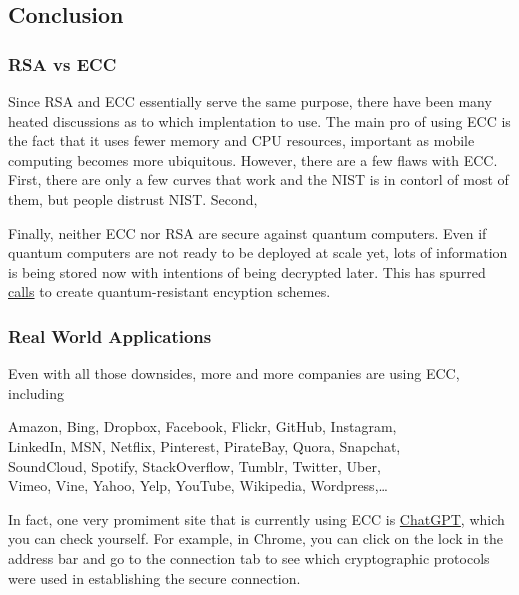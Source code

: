 \documentclass{article}
\begin{document}

\subsection*{Conclusion}

    \subsubsection*{RSA vs ECC}

    Since RSA and ECC essentially serve the same purpose, there have been many heated discussions as to which implentation to use. The main pro of using ECC is the fact that it uses fewer memory and CPU resources, important as mobile computing becomes more ubiquitous. However, there are a few flaws with ECC. First, there are only a few curves that work and the NIST is in contorl of most of them, but people distrust NIST. Second, 

    \vspace{2mm}
    Finally, neither ECC nor RSA are secure against quantum computers. Even if quantum computers are not ready to be deployed at scale yet, lots of information is being stored now with intentions of being decrypted later. This has spurred \href{https://csrc.nist.gov/projects/post-quantum-cryptography}{calls} to create quantum-resistant encyption schemes.

    \subsubsection*{Real World Applications}

    Even with all those downsides, more and more companies are using ECC, including

    \begin{center}
        Amazon, Bing, Dropbox, Facebook, Flickr, GitHub, Instagram, \\
        LinkedIn, MSN, Netflix, Pinterest, PirateBay, Quora, Snapchat, \\
        SoundCloud, Spotify, StackOverflow, Tumblr, Twitter, Uber, \\
        Vimeo, Vine, Yahoo, Yelp, YouTube, Wikipedia, Wordpress,\dots
    \end{center}
    In fact, one very promiment site that is currently using ECC is \href{https://chat.openai.com/chat}{ChatGPT}, which you can check yourself. For example, in Chrome, you can click on the lock in the address bar and go to the connection tab to see which cryptographic protocols were used in establishing the secure connection.
\end{document}
